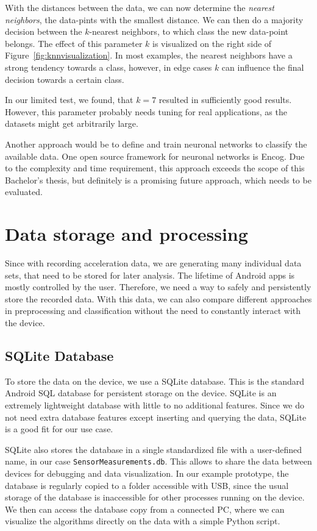 With the distances between the data, we can now determine the \emph{nearest neighbors}, \ie the data-pints with the smallest distance. We can then do a majority decision between the $k$-nearest neighbors, to which class the new data-point belongs. The effect of this parameter $k$ is visualized on the right side of Figure~\ref{fig:knnvisualization}. In most examples, the nearest neighbors have a strong tendency towards a class, however, in edge cases $k$ can influence the final decision towards a certain class.

In our limited test, we found, that $k = 7$ resulted in sufficiently good results. However, this parameter probably needs tuning for real applications, as the datasets might get arbitrarily large.

Another approach would be to define and train neuronal networks to classify the available data. One open source framework for neuronal networks is Encog\cite{heaton2016encog}. Due to the complexity and time requirement, this approach exceeds the scope of this Bachelor's thesis, but definitely is a promising future approach, which needs to be evaluated.

\section{Data storage and processing}
Since with recording acceleration data, we are generating many individual data sets, that need to be stored for later analysis. The lifetime of Android apps is mostly controlled by the user. Therefore, we need a way to safely and persistently store the recorded data. With this data, we can also compare different approaches in preprocessing and classification without the need to constantly interact with the device.

\subsection{SQLite Database}
To store the data on the device, we use a SQLite database. This is the standard Android SQL database for persistent storage on the device. SQLite is an extremely lightweight database with little to no additional features. Since we do not need extra database features except inserting and querying the data, SQLite is a good fit for our use case.

SQLite also stores the database in a single standardized file with a user-defined name, in our case \lstinline$SensorMeasurements.db$. This allows to share the data between devices for debugging and data visualization. In our example prototype, the database is regularly copied to a folder accessible with USB, since the usual storage of the database is inaccessible for other processes running on the device. We then can access the database copy from a connected PC, where we can visualize the algorithms directly on the data with a simple Python script.

